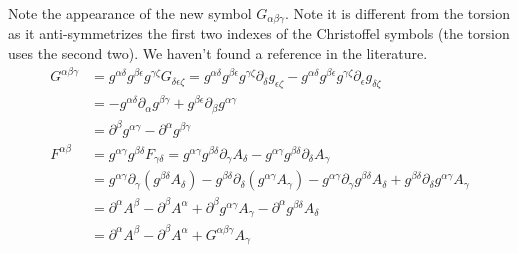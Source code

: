 \documentclass[11pt]{article}
\begin{document}
Note the appearance of the new symbol $G_{\alpha\beta\gamma}$. Note it is different from the torsion as it anti-symmetrizes the first two indexes of the Christoffel symbols (the torsion uses the second two). We haven't found a reference in the literature.
\begin{equation}
\begin{aligned}
G^{\alpha\beta\gamma} &= g^{\alpha\delta}g^{\beta\epsilon}g^{\gamma\zeta} G_{\delta\epsilon\zeta} = g^{\alpha\delta}g^{\beta\epsilon}g^{\gamma\zeta} \partial_\delta g_{\epsilon\zeta} - g^{\alpha\delta}g^{\beta\epsilon}g^{\gamma\zeta} \partial_\epsilon g_{\delta\zeta}\\
&= - g^{\alpha\delta} \partial_\alpha g^{\beta\gamma} + g^{\beta\epsilon} \partial_\beta g^{\alpha\gamma} \\
&= \partial^\beta g^{\alpha\gamma} - \partial^\alpha g^{\beta\gamma} \\
F^{\alpha\beta} &= g^{\alpha\gamma}g^{\beta\delta} F_{\gamma\delta} = g^{\alpha\gamma}g^{\beta\delta} \partial_\gamma A_{\delta} - g^{\alpha\gamma}g^{\beta\delta} \partial_\delta A_{\gamma}  \\
&= g^{\alpha\gamma} \partial_\gamma (g^{\beta\delta} A_{\delta}) - g^{\beta\delta} \partial_\delta ( g^{\alpha\gamma}A_{\gamma}) - g^{\alpha\gamma} \partial_\gamma g^{\beta\delta} A_{\delta} + g^{\beta\delta} \partial_\delta g^{\alpha\gamma}A_{\gamma}\\
&= \partial^\alpha A^\beta - \partial^\beta A^\alpha + \partial ^\beta g^{\alpha \gamma} A_\gamma - \partial^\alpha g^{\beta \delta} A_\delta\\
&= \partial^\alpha A^\beta - \partial^\beta A^\alpha +G^{\alpha\beta\gamma} A_\gamma
\end{aligned}
\end{equation}
\end{document}
